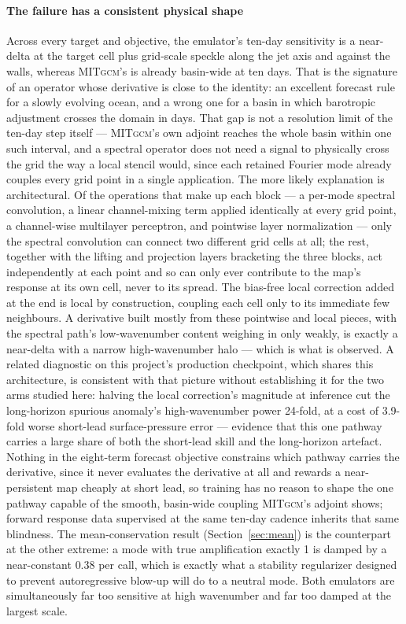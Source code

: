 \documentclass[3p,12pt]{elsarticle}
\newcommand{\MITgcm}{\textsc{MITgcm}}
\begin{document}
\paragraph{The failure has a consistent physical shape} Across every target and
objective, the emulator's ten-day sensitivity is a near-delta at the target cell
plus grid-scale speckle along the jet axis and against the walls, whereas
\MITgcm{}'s is already basin-wide at ten days. That is the signature of an
operator whose derivative is close to the identity: an excellent forecast rule
for a slowly evolving ocean, and a wrong one for a basin in which barotropic
adjustment crosses the domain in days. That gap is not a resolution limit of
the ten-day step itself --- \MITgcm{}'s own adjoint reaches the whole basin
within one such interval, and a spectral operator does not need a signal to
physically cross the grid the way a local stencil would, since each retained
Fourier mode already couples every grid point in a single application. The more
likely explanation is architectural. Of the operations that make up each block
--- a per-mode spectral convolution, a linear channel-mixing term applied
identically at every grid point, a channel-wise multilayer perceptron, and
pointwise layer normalization --- only the spectral convolution can connect two
different grid cells at all; the rest, together with the lifting and
projection layers bracketing the three blocks, act independently at each point
and so can only ever contribute to the map's response at its own cell, never
to its spread. The bias-free local correction added at the end is local by
construction, coupling each cell only to its immediate few neighbours. A
derivative built mostly from these pointwise and local pieces, with the
spectral path's low-wavenumber content weighing in only weakly, is exactly a
near-delta with a narrow high-wavenumber halo --- which is what is observed. A
related diagnostic on this project's production checkpoint, which shares this
architecture, is consistent with that picture without establishing it for the
two arms studied here: halving the local correction's magnitude at inference
cut the long-horizon spurious anomaly's high-wavenumber power 24-fold, at a
cost of 3.9-fold worse short-lead surface-pressure error --- evidence that this
one pathway carries a large share of both the short-lead skill and the
long-horizon artefact. Nothing in the eight-term forecast objective constrains
which pathway carries the derivative, since it never evaluates the derivative
at all and rewards a near-persistent map cheaply at short lead, so training has
no reason to shape the one pathway capable of the smooth, basin-wide coupling
\MITgcm{}'s adjoint shows; forward response data supervised at the same
ten-day cadence inherits that same blindness. The mean-conservation
result (Section~\ref{sec:mean}) is the counterpart at the other extreme: a mode
with true amplification exactly 1 is damped by a near-constant $0.38$ per call,
which is exactly what a stability regularizer designed to prevent autoregressive
blow-up will do to a neutral mode. Both emulators are simultaneously far too
sensitive at high wavenumber and far too damped at the largest scale.
\end{document}
